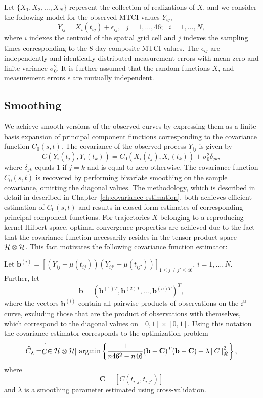 Let $\{X_{1},X_{2},\dots,X_{N}\}$ represent the collection of realizations of $X$, and we consider the following model for the observed MTCI values $Y_{ij}$,
\[ Y_{ij}=X_{i}(t_{ij})+\epsilon_{ij},\mbox{ }j=1,\dots,46;\mbox{ }i=1,\dots,N, \]
where $i$ indexes the centroid of the spatial grid cell and $j$ indexes the sampling times corresponding to the 8-day composite MTCI values. The $\epsilon_{ij}$ are independently and identically distributed measurement errors with mean zero and finite variance $\sigma_{0}^{2}.$ It is further assumed that the random functions $X$, and measurement errors $\epsilon$ are mutually independent. 

\subsection{Smoothing} 

\label{sub:smoothing}
We achieve smooth versions of the observed curves by expressing them as a finite basis expansion of principal component functions corresponding to the covariance function $C_0(s,t)$. The covariance of the observed process $Y_{ij}$ is given by
\begin{equation}
	C(Y_i(t_j), Y_i(t_k)) = C_0(X_i(t_j), X_i(t_k)) + \sigma^2_0 \delta_{jk},
\end{equation}
where $\delta_{jk}$ equals 1 if $j=k$ and is equal to zero otherwise. The covariance function $C_0(s,t)$ is recovered by performing bivariate smoothing on the sample covariance, omitting the diagonal values. The methodology, which is described in detail in described in Chapter~\ref{ch:covariance estimation}, both achieves efficient estimation of $C_0(s,t)$ and results in closed-form estimates of corresponding principal component functions. For trajectories $X$ belonging to a reproducing kernel Hilbert space, optimal convergence properties are achieved due to the fact that the covariance function necessarily resides in the tensor product space $\mathcal{H}\otimes\mathcal{H}$. This fact motivates the following covariance function estimator:

Let $\mathbf{b}^{(i)} = [(Y_{ij}-\mu(t_{ij}))(Y_{ij'}-\mu(t_{ij'}))]_{1\leq j\neq j'\leq 46}$, $i=1, \dots, N$. Further, let
\[ \mathbf{b} = (\mathbf{b}^{(1)T}, \mathbf{b}^{(2)T}, \dots, \mathbf{b}^{(n)T} )^T, \]
where the vectors $\mathbf{b}^{(i)}$ contain all pairwise products of observations on the $i^{\mbox{th}}$ curve, excluding those that are the product of observations with themselves, which correspond to the diagonal values on $[0,1]\times [0,1]$. Using this notation the covariance estimator corresponds to the optimization problem
\begin{equation}
	 \widehat{C}_{\lambda}=\stackrel[C \in \mathcal{H}\otimes \mathcal{H}]{}{\text{ argmin}} \left\{\frac{1}{n46^2-n46} (\mathbf{b} - \mathbf{C})^T(\mathbf{b} - \mathbf{C})+\lambda\left\Vert C\right\Vert _{\breve{\mathcal{H}}}^{2} \right\},
	 \label{pheno: cov est}
	 \end{equation}
where
\[ \mathbf{C} = [C(t_{i,j}, t_{i'j'})] \]
and $\lambda$ is a smoothing parameter estimated using cross-validation.

